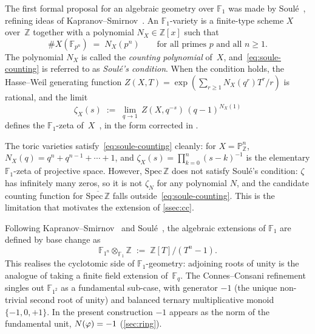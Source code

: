 The first formal proposal for an algebraic geometry over
$\mathbb{F}_1$ was made by Soul\'e~\cite{soule03}, refining
ideas of Kapranov--Smirnov~\cite{kapranovsmirnov}.  An
$\mathbb{F}_1$-variety is a finite-type scheme $X$
over~$\mathbb{Z}$ together with a polynomial $N_X\in\mathbb{Z}[x]$
such that
\begin{equation}\label{eq:soule-counting}
  \#X(\mathbb{F}_{p^n}) \;=\; N_X(p^n)
  \qquad\text{for all primes } p \text{ and all } n\ge 1.
\end{equation}
The polynomial $N_X$ is called the \emph{counting polynomial}
of~$X$, and~\eqref{eq:soule-counting} is referred to as
\emph{Soul\'e's condition}.  When the condition holds, the
Hasse--Weil generating function
$Z(X,T) = \exp\!\left(\sum_{r\ge 1} N_X(q^r)T^r/r\right)$
is rational, and the limit
\begin{equation}\label{eq:soule-zeta-2}
  \zeta_X(s) \;:=\; \lim_{q\to 1}\,Z(X,q^{-s})\,(q-1)^{N_X(1)}
\end{equation}
defines the $\mathbb{F}_1$-zeta of~$X$~\cite[\S6]{soule03}, in the form corrected in \cite[Eq.~(3)]{connesconsani10}.

The toric varieties satisfy~\eqref{eq:soule-counting} cleanly: for
$X = \mathbb{P}^n_\mathbb{Z}$, $N_X(q) = q^n + q^{n-1} +
\cdots + 1$, and $\zeta_X(s) = \prod_{k=0}^n (s-k)^{-1}$ is
the elementary $\mathbb{F}_1$-zeta of projective space.  However,
$\mathrm{Spec}\,\mathbb{Z}$ does not satisfy
Soul\'e's condition: $\zeta$ has infinitely many zeros, so it is not $\zeta_N$ for any
polynomial $N$, and the candidate counting function for
$\overline{\mathrm{Spec}\,\mathbb{Z}}$ falls outside~\eqref{eq:soule-counting}.  This is the limitation
that motivates the extension of \cref{ssec:cc}.

\begin{remark}\label{rmk:F1n}
Following Kapranov--Smirnov~\cite{kapranovsmirnov} and
Soul\'e~\cite{soule03}, the algebraic extensions of
$\mathbb{F}_1$ are defined by base change as
\begin{equation}\label{eq:F1n}
  \mathbb{F}_{1^n}\otimes_{\mathbb{F}_1}\mathbb{Z}
  \;:=\; \mathbb{Z}[T]/(T^n - 1).
\end{equation}
This realises the cyclotomic side of $\mathbb{F}_1$-geometry:
adjoining roots of unity is the analogue of taking a finite
field extension of~$\mathbb{F}_q$.  The Connes--Consani
refinement~\cite{connesconsani11} singles out
$\mathbb{F}_{1^2}$ as a fundamental sub-case, with
generator $-1$ \textup{(}the unique non-trivial second root of
unity\textup{)} and balanced ternary multiplicative monoid
$\{-1,0,+1\}$.  In the present construction $-1$ appears as the norm of the
fundamental unit, $N(\varphi)=-1$  \textup{(\cref{sec:ring})}.
\end{remark}

